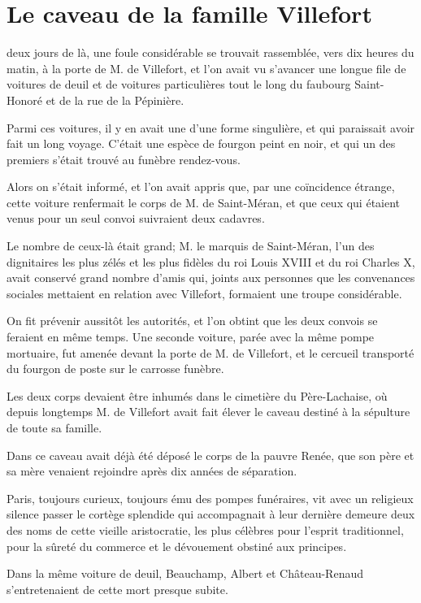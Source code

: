 \chapter{Le caveau de la famille Villefort} 

\lettrine{}{} deux jours de là, une foule considérable se trouvait rassemblée, vers dix heures du matin, à la porte de M. de Villefort, et l'on avait vu s'avancer une longue file de voitures de deuil et de voitures particulières tout le long du faubourg Saint-Honoré et de la rue de la Pépinière. 

Parmi ces voitures, il y en avait une d'une forme singulière, et qui paraissait avoir fait un long voyage. C'était une espèce de fourgon peint en noir, et qui un des premiers s'était trouvé au funèbre rendez-vous. 

Alors on s'était informé, et l'on avait appris que, par une coïncidence étrange, cette voiture renfermait le corps de M. de Saint-Méran, et que ceux qui étaient venus pour un seul convoi suivraient deux cadavres. 

Le nombre de ceux-là était grand; M. le marquis de Saint-Méran, l'un des dignitaires les plus zélés et les plus fidèles du roi Louis XVIII et du roi Charles X, avait conservé grand nombre d'amis qui, joints aux personnes que les convenances sociales mettaient en relation avec Villefort, formaient une troupe considérable. 

On fit prévenir aussitôt les autorités, et l'on obtint que les deux convois se feraient en même temps. Une seconde voiture, parée avec la même pompe mortuaire, fut amenée devant la porte de M. de Villefort, et le cercueil transporté du fourgon de poste sur le carrosse funèbre. 

Les deux corps devaient être inhumés dans le cimetière du Père-Lachaise, où depuis longtemps M. de Villefort avait fait élever le caveau destiné à la sépulture de toute sa famille. 

Dans ce caveau avait déjà été déposé le corps de la pauvre Renée, que son père et sa mère venaient rejoindre après dix années de séparation. 

Paris, toujours curieux, toujours ému des pompes funéraires, vit avec un religieux silence passer le cortège splendide qui accompagnait à leur dernière demeure deux des noms de cette vieille aristocratie, les plus célèbres pour l'esprit traditionnel, pour la sûreté du commerce et le dévouement obstiné aux principes. 

Dans la même voiture de deuil, Beauchamp, Albert et Château-Renaud s'entretenaient de cette mort presque subite. 

